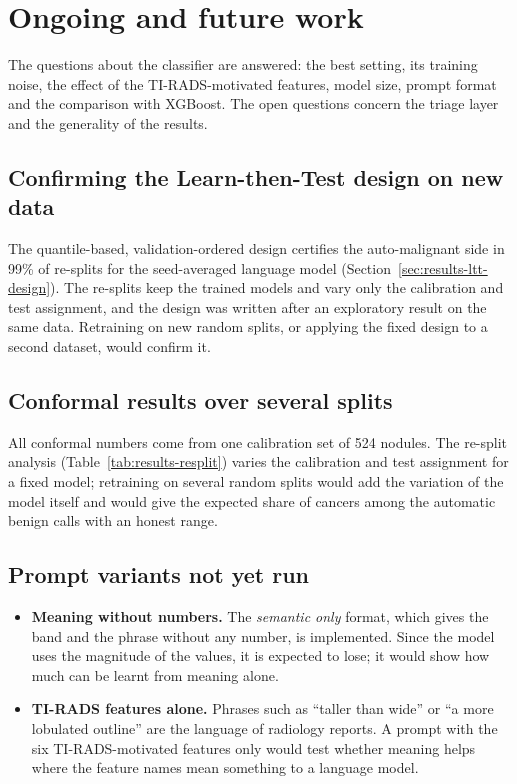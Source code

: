 \chapter{Ongoing and future work}
\label{ch:future}

The questions about the classifier are answered: the best setting, its training noise, the effect
of the TI-RADS-motivated features, model size, prompt format and the comparison with XGBoost. The
open questions concern the triage layer and the generality of the results.

\section{Confirming the Learn-then-Test design on new data}
\label{sec:future-running}

The quantile-based, validation-ordered design certifies the auto-malignant side in 99\% of
re-splits for the seed-averaged language model (Section~\ref{sec:results-ltt-design}). The
re-splits keep the trained models and vary only the calibration and test assignment, and the
design was written after an exploratory result on the same data. Retraining on new random splits,
or applying the fixed design to a second dataset, would confirm it.

\section{Conformal results over several splits}

All conformal numbers come from one calibration set of 524 nodules. The re-split analysis
(Table~\ref{tab:results-resplit}) varies the calibration and test assignment for a fixed model;
retraining on several random splits would add the variation of the model itself and would give
the expected share of cancers among the automatic benign calls with an honest range.

\section{Prompt variants not yet run}
\label{sec:future-prompts}

\begin{itemize}
  \item \textbf{Meaning without numbers.} The \emph{semantic only} format, which gives the band and
        the phrase without any number, is implemented. Since the model uses the magnitude of the
        values, it is expected to lose; it would show how much can be learnt from meaning alone.
  \item \textbf{TI-RADS features alone.} Phrases such as ``taller than wide'' or ``a more lobulated
        outline'' are the language of radiology reports. A prompt with the six TI-RADS-motivated
        features only would test whether meaning helps where the feature names mean something
        to a language model.
\end{itemize}


